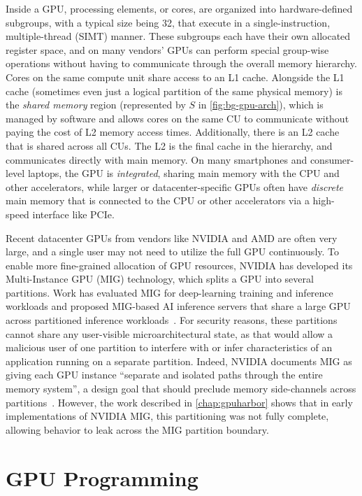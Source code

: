 Inside a GPU, processing elements, or cores, are organized into hardware-defined subgroups, with a typical size being 32, that execute in a single-instruction, multiple-thread (SIMT) manner. These subgroups each have their own allocated register space, and on many vendors' GPUs can perform special group-wise operations without having to communicate through the overall memory hierarchy. Cores on the same compute unit share access to an L1 cache. Alongside the L1 cache (sometimes even just a logical partition of the same physical memory) is the \textit{shared memory} region (represented by $S$ in \myfig\ref{fig:bg-gpu-arch}), which is managed by software and allows cores on the same CU to communicate without paying the cost of L2 memory access times. Additionally, there is an L2 cache that is shared across all CUs. The L2 is the final cache in the hierarchy, and communicates directly with main memory. On many smartphones and consumer-level laptops, the GPU is \textit{integrated}, sharing main memory with the CPU and other accelerators, while larger or datacenter-specific GPUs often have \textit{discrete} main memory that is connected to the CPU or other accelerators via a high-speed interface like PCIe.

Recent datacenter GPUs from vendors like NVIDIA and AMD are often very large, and a single user may not need to utilize the full GPU continuously. To enable more fine-grained allocation of GPU resources, NVIDIA has developed its Multi-Instance GPU (MIG) technology, which splits a GPU into several partitions. Work has evaluated MIG for deep-learning training and inference workloads and proposed MIG-based AI inference servers that share a large GPU across partitioned inference workloads~\cite{zhang2023migperf,yeo2024preba}. For security reasons, these partitions cannot share any user-visible microarchitectural state, as that would allow a malicious user of one partition to interfere with or infer characteristics of an application running on a separate partition. Indeed, NVIDIA documents MIG as giving each GPU instance ``separate and isolated paths through the entire memory system'', a design goal that should preclude memory side-channels across partitions~\cite{nvidia2022hopper}. However, the work described in \mychap\ref{chap:gpuharbor} shows that in early implementations of NVIDIA MIG, this partitioning was not fully complete, allowing behavior to leak across the MIG partition boundary.

\section{GPU Programming}
\label{sec:bg-sw}

